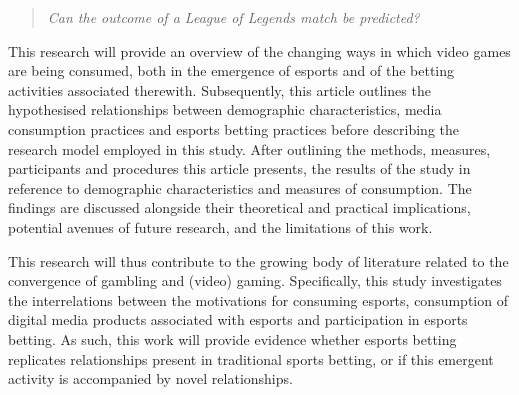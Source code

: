 \begin{quote}  \emph{Can the outcome of a League of Legends match be predicted?} \end{quote}


This research will provide an overview of the changing ways in which video games are being consumed, both in the emergence of esports and of the betting activities associated therewith.
Subsequently, this article outlines the hypothesised relationships between demographic characteristics, media consumption practices and esports betting practices before describing the research model employed in this study.
After outlining the methods, measures, participants and procedures this article presents, the results of the study in reference to demographic characteristics and measures of consumption.
The findings are discussed alongside their theoretical and practical implications, potential avenues of future research, and the limitations of this work.

This research will thus contribute to the growing body of literature related to the convergence of gambling and (video) gaming.
Specifically, this study investigates the interrelations between the motivations for consuming esports, consumption of digital media products associated with esports and participation in esports betting.
As such, this work will provide evidence whether esports betting replicates relationships present in traditional sports betting, or if this emergent activity is accompanied by novel relationships.